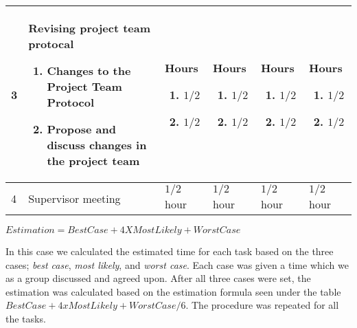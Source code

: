 \begin{left}
\begin{tabular}{ | l | p{5cm} | p{2cm} | p{2cm} | p{2cm} | p{2cm} |}
	
	3 & Revising project team protocal \begin{enumerate}
		\item Changes to the Project Team Protocol
		\item Propose and discuss changes in the project team 
	\end{enumerate} & Hours \begin{enumerate} %
		\item $1/2$
		\item $1/2$
	\end{enumerate} & Hours \begin{enumerate} %
		\item $1/2$
		\item $1/2$
	\end{enumerate} & Hours \begin{enumerate} %
		\item $1/2$
		\item $1/2$
	\end{enumerate} & Hours \begin{enumerate} %
		\item $1/2$
		\item $1/2$		
	\end{enumerate} \\ \hline 
	
	4 & Supervisor meeting & $1/2$ hour & $1/2$ hour & $1/2$ hour & $1/2$ hour
	\\
    \hline
    \end{tabular}
\end{left}

$Estimation =Best Case +4XMost Likely+Worst Case$

In this case we calculated the estimated time for each task based on the three cases; \textit{best case}, \textit{most likely}, and \textit{worst case}. Each case was given a time which we as a group discussed and agreed upon. After all three cases were set, the estimation was calculated based on the estimation formula seen under the table $BestCase + 4 x MostLikely + WorstCase / 6$. The procedure was repeated for all the tasks.

